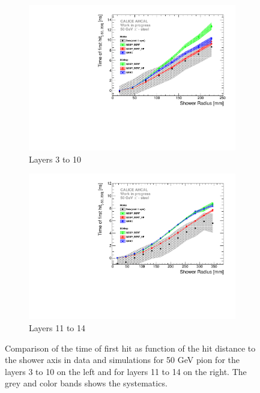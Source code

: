 \begin{figure}[htbp!]
	\begin{subfigure}[t]{0.5\textwidth}
		\centering
		\includegraphics[width=1\textwidth]{../Thesis_Plots/Timing/Pions/Plots/ComparisonToSim/Time_Radius_50GeV_SSF.pdf}
		\caption{Layers 3 to 10} \label{fig:Radius_SSF_SimData_50GeV}
	\end{subfigure}
	\hfill
	\begin{subfigure}[t]{0.5\textwidth}
		\centering
		\includegraphics[width=1\textwidth]{../Thesis_Plots/Timing/Pions/Plots/ComparisonToSim/Time_Radius_50GeV_BL.pdf}
		\caption{Layers 11 to 14} \label{fig:Radius_BL_SimData_50GeV}
	\end{subfigure}
	\caption{Comparison of the time of first hit as function of the hit distance to the shower axis in data and simulations for 50 GeV pion for the layers 3 to 10 on the left and for layers 11 to 14 on the right. The grey and color bands shows the systematics.}
	\label{fig:Radius_SSF_SimData_50GeVComparison}
\end{figure}

